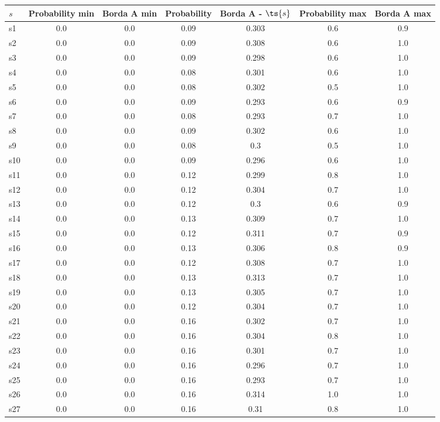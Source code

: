 \documentclass{article}
\begin{document}
\noindent\begin{tabular}{|l|c|c|c|c|c|c|}
\hline
$s$& Probability min & Borda A min & Probability & Borda A - $\ts{s}$ & Probability max & Borda A max\\
\hline
s1 &0.0 & 0.0 & 0.09 & 0.303 & 0.6 & 0.9\\
\hline
s2 &0.0 & 0.0 & 0.09 & 0.308 & 0.6 & 1.0\\
\hline
s3 &0.0 & 0.0 & 0.09 & 0.298 & 0.6 & 1.0\\
\hline
s4 &0.0 & 0.0 & 0.08 & 0.301 & 0.6 & 1.0\\
\hline
s5 &0.0 & 0.0 & 0.08 & 0.302 & 0.5 & 1.0\\
\hline
s6 &0.0 & 0.0 & 0.09 & 0.293 & 0.6 & 0.9\\
\hline
s7 &0.0 & 0.0 & 0.08 & 0.293 & 0.7 & 1.0\\
\hline
s8 &0.0 & 0.0 & 0.09 & 0.302 & 0.6 & 1.0\\
\hline
s9 &0.0 & 0.0 & 0.08 & 0.3 & 0.5 & 1.0\\
\hline
s10 &0.0 & 0.0 & 0.09 & 0.296 & 0.6 & 1.0\\
\hline
s11 &0.0 & 0.0 & 0.12 & 0.299 & 0.8 & 1.0\\
\hline
s12 &0.0 & 0.0 & 0.12 & 0.304 & 0.7 & 1.0\\
\hline
s13 &0.0 & 0.0 & 0.12 & 0.3 & 0.6 & 0.9\\
\hline
s14 &0.0 & 0.0 & 0.13 & 0.309 & 0.7 & 1.0\\
\hline
s15 &0.0 & 0.0 & 0.12 & 0.311 & 0.7 & 0.9\\
\hline
s16 &0.0 & 0.0 & 0.13 & 0.306 & 0.8 & 0.9\\
\hline
s17 &0.0 & 0.0 & 0.12 & 0.308 & 0.7 & 1.0\\
\hline
s18 &0.0 & 0.0 & 0.13 & 0.313 & 0.7 & 1.0\\
\hline
s19 &0.0 & 0.0 & 0.13 & 0.305 & 0.7 & 1.0\\
\hline
s20 &0.0 & 0.0 & 0.12 & 0.304 & 0.7 & 1.0\\
\hline
s21 &0.0 & 0.0 & 0.16 & 0.302 & 0.7 & 1.0\\
\hline
s22 &0.0 & 0.0 & 0.16 & 0.304 & 0.8 & 1.0\\
\hline
s23 &0.0 & 0.0 & 0.16 & 0.301 & 0.7 & 1.0\\
\hline
s24 &0.0 & 0.0 & 0.16 & 0.296 & 0.7 & 1.0\\
\hline
s25 &0.0 & 0.0 & 0.16 & 0.293 & 0.7 & 1.0\\
\hline
s26 &0.0 & 0.0 & 0.16 & 0.314 & 1.0 & 1.0\\
\hline
s27 &0.0 & 0.0 & 0.16 & 0.31 & 0.8 & 1.0\\

\end{tabular}
\end{document}
